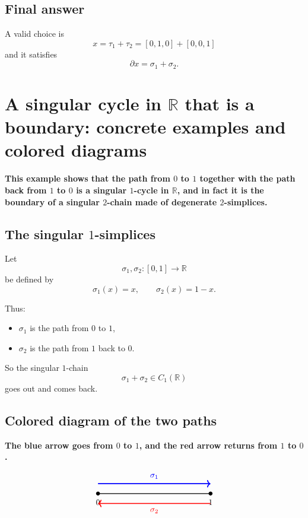 \documentclass[12pt,a4paper]{article}
\theoremstyle{notespace}
\begin{document}
\subsection{Final answer}

A valid choice is
\[
\boxed{x=\tau_1+\tau_2=[0,1,0]+[0,0,1]}
\]
and it satisfies
\[
\boxed{\partial x=\sigma_1+\sigma_2.}
\]

\section{A singular cycle in \(\mathbb{R}\) that is a boundary: concrete examples and colored diagrams}

\textbf{This example shows that the path from \(0\) to \(1\) together with the path back from \(1\) to \(0\) is a singular \(1\)-cycle in \(\mathbb{R}\), and in fact it is the boundary of a singular \(2\)-chain made of degenerate \(2\)-simplices.}

\subsection{The singular \(1\)-simplices}

Let
\[
\sigma_1,\sigma_2:[0,1]\to \mathbb{R}
\]
be defined by
\[
\sigma_1(x)=x,
\qquad
\sigma_2(x)=1-x.
\]

Thus:

\begin{itemize}
	\item \(\sigma_1\) is the path from \(0\) to \(1\),
	\item \(\sigma_2\) is the path from \(1\) back to \(0\).
\end{itemize}

So the singular \(1\)-chain
\[
\sigma_1+\sigma_2\in C_1(\mathbb{R})
\]
goes out and comes back.

\subsection{Colored diagram of the two paths}

\textbf{The blue arrow goes from \(0\) to \(1\), and the red arrow returns from \(1\) to \(0\).}

\[
\begin{tikzpicture}[scale=1.2]
	\fill (0,0) circle (2pt) node[below=4pt] {\(0\)};
	\fill (4,0) circle (2pt) node[below=4pt] {\(1\)};
	
	\draw[thick] (0,0) -- (4,0);
	
	\draw[->, very thick, blue] (0,0.35) -- (4,0.35)
	node[midway, above=2pt] {\(\sigma_1\)};
	\draw[<-, very thick, red] (0,-0.35) -- (4,-0.35)
	node[midway, below=2pt] {\(\sigma_2\)};
\end{tikzpicture}
\]
\end{document}
